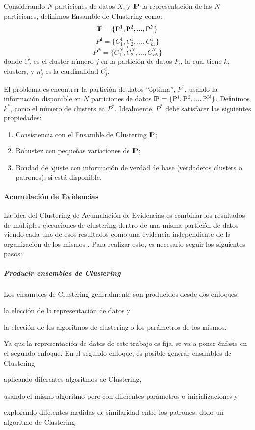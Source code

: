 \bigskip Considerando \(N\) particiones de datos \(X\), y \(\rm I\!P\) la representación de las \(N\) particiones, definimos Ensamble de Clustering como:
\[\rm I\!P = \{P^1, P^2, ..., P^N\}\]
\[P^1 = \{C^1_1, C^1_2, ..., C^1_{k1}\}\]
\[.\]
\[.\]
\[P^N = \{C^N_1, C^N_2, ..., C^N_{kN}\}\]
donde \(C^i_j\) es el cluster número \(j\) en la partición de datos \(P_i\), la cual tiene \(k_i\) clusters, y \(n^i_j\) es la cardinalidad  \(C^i_j\).

\bigskip El problema es encontrar la partición de datos “óptima”, \(P^*\), usando la información disponible en \(N\) particiones de datos \(\rm I\!P = \{P^1, P^2, ..., P^N\}\). Definimos \(k^*\), como el número de clusters en \(P^*\). Idealmente, \(P^*\) debe satisfacer las siguientes propiedades:

\begin{enumerate}
	\item Consistencia con el Ensamble de Clustering \(\rm I\!P\);
	\item Robustez con pequeñas variaciones de \(\rm I\!P\);
	\item Bondad de ajuste con información de verdad de base (verdaderos clusters o patrones), si está disponible.
\end{enumerate}

\paragraph{Acumulación de Evidencias}
La idea del Clustering de Acumulación de Evidencias es combinar los resultados de múltiples ejecuciones de clustering dentro de una misma partición de datos viendo cada uno de esos resultados como una evidencia independiente de la organización de los mismos \citep{fred2005combining}. Para realizar esto, es necesario seguir los siguientes pasos:

\subparagraph{Producir ensambles de Clustering}
Los ensambles de Clustering generalmente son producidos desde dos enfoques:
\begin{enumerate*}
	\item la elección de la representación de datos y
	\item la elección de los algoritmos de clustering o los parámetros de los mismos.
\end{enumerate*}
Ya que la representación de datos de este trabajo es fija, se va a poner énfasis en el segundo enfoque. En el segundo enfoque, es posible generar ensambles de Clustering \begin{enumerate*} [label=(\roman*)] \item aplicando diferentes algoritmos de Clustering, \item usando el mismo algoritmo pero con diferentes parámetros o inicializaciones y \item explorando diferentes medidas de similaridad entre los patrones, dado un algoritmo de Clustering.\end{enumerate*}

